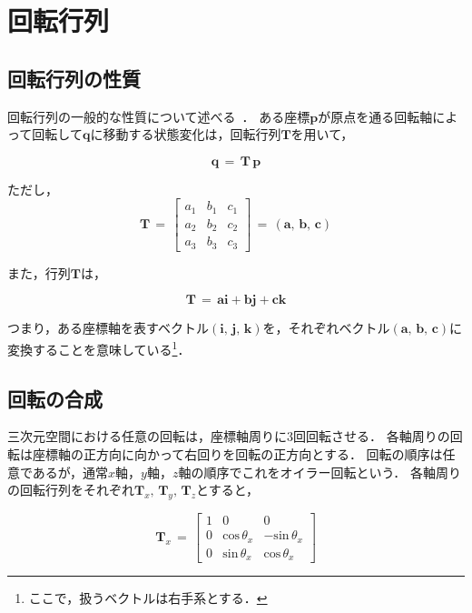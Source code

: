 \graphicspath{{./fig_APDX/}}
%

\section{回転行列}

%
\subsection{回転行列の性質}
回転行列の一般的な性質について述べる~\cite{shimada:00:cadcg, ohishi:94:graphics}．
ある座標$\bm p$が原点を通る回転軸によって回転して$\bm q$に移動する状態変化は，回転行列$\bm T$を用いて，

\begin{equation}
\bm q \,=\, \bm{T\,p}
\label{eq:trans-matrix}
\end{equation}

ただし，
\begin{equation}
\bm T \,=\, \left[
\begin{array}{ccc}
a_1 & b_1 & c_1 \\
a_2 & b_2 & c_2 \\
a_3 & b_3 & c_3 
\end{array}
\right] \,=\, (\bm a,\, \bm b,\, \bm c)
\label{eq:matrix def}
\end{equation}

また，行列$\bm T$は，

\begin{equation}
\bm T \,=\, \bm{ai} + \bm{bj} + \bm{ck}
\label{eq:matrixT}
\end{equation}

つまり，ある座標軸を表すベクトル$(\bm i,\, \bm j,\, \bm k)$を，それぞれベクトル$(\bm a,\, \bm b,\, \bm c)$に変換することを意味している\footnote{ここで，扱うベクトルは右手系とする．}．

%
\subsection{回転の合成}
三次元空間における任意の回転は，座標軸周りに3回回転させる．
各軸周りの回転は座標軸の正方向に向かって右回りを回転の正方向とする．
回転の順序は任意であるが，通常$x$軸，$y$軸，$z$軸の順序でこれをオイラー回転という．
各軸周りの回転行列をそれぞれ${\bm T}_x,\, {\bm T}_y,\, {\bm T}_z$とすると，

\begin{equation}
{\bm T}_x \,=\,
\left[
\begin{array}{ccc}
1 & 0 & 0\\
0 & \mathrm{cos}\,\theta_x & \mathrm{-sin}\,\theta_x\\
0 & \mathrm{sin}\,\theta_x & \mathrm{cos}\,\theta_x
\end{array}
\right]
\label{eq:Tx}
\end{equation}


